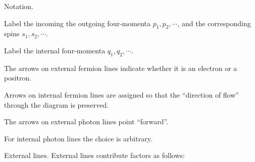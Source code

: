 \documentclass[hidelinks]{article}
\begin{document}
\begin{cenum}
    \item Notation.
    \begin{cenum}
        \item Label the incoming the outgoing four-momenta $p_1,p_2,\cdots$, and the corresponding spins $s_1,s_2,\cdots$.
        \item Label the internal four-momenta $q_1,q_2,\cdots$.
        \item The arrows on external fermion lines indicate whether it is an electron or a positron.
        \item Arrows on internal fermion lines are assigned so that the ``direction of flow'' through the diagram is preserved.
        \item The arrows on external photon lines point ``forward''.
        \item For internal photon lines the choice is arbitrary.
    \end{cenum}
    \item External lines. External lines contribute factors as follows:
\end{cenum}
\end{document}
